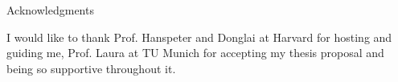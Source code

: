 \thispagestyle{empty}

\vspace*{20mm}

\begin{center}
{ Acknowledgments}
\end{center}

\vspace{10mm}

I would like to thank Prof. Hanspeter and Donglai at Harvard for hosting and guiding me, Prof. Laura at TU Munich for accepting my thesis proposal and being so supportive throughout it.

\cleardoublepage{}
